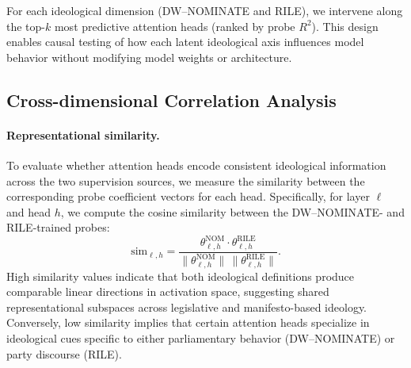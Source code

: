 \documentclass[11pt]{article}
\begin{document}
For each ideological dimension (DW--NOMINATE and RILE), we intervene along the top-$k$ most predictive attention heads (ranked by probe $R^2$). This design enables causal testing of how each latent ideological axis influences model behavior without modifying model weights or architecture.

\subsection{Cross-dimensional Correlation Analysis}

\paragraph{Representational similarity.}
To evaluate whether attention heads encode consistent ideological information across the two supervision sources, we measure the similarity between the corresponding probe coefficient vectors for each head. Specifically, for layer $\ell$ and head $h$, we compute the cosine similarity between the DW--NOMINATE- and RILE-trained probes:
\begin{equation*}
    \text{sim}_{\ell,h} = 
    \frac{\theta_{\ell,h}^{\text{NOM}} \cdot \theta_{\ell,h}^{\text{RILE}}}
         {\|\theta_{\ell,h}^{\text{NOM}}\| \, \|\theta_{\ell,h}^{\text{RILE}}\|}.
\end{equation*}
High similarity values indicate that both ideological definitions produce comparable linear directions in activation space, suggesting shared representational subspaces across legislative and manifesto-based ideology. Conversely, low similarity implies that certain attention heads specialize in ideological cues specific to either parliamentary behavior (DW--NOMINATE) or party discourse (RILE).
\end{document}
